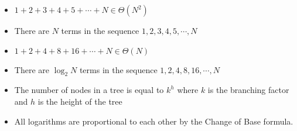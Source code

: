 \begin{itemize}
\item $1 + 2 + 3 + 4 + 5 + \cdots + N \in \Theta(N^2)$
\item There are $N$ terms in the sequence $1, 2, 3, 4, 5, \cdots, N$
\item $1 + 2 + 4 + 8 + 16 + \cdots + N \in \Theta(N)$
\item There are $\log_{2} N$ terms in the sequence $1, 2, 4, 8, 16, \cdots, N$
\item The number of nodes in a tree is equal to $k^{h}$ where $k$ is the
branching factor and $h$ is the height of the tree
\item All logarithms are proportional to each other by the Change of Base
formula.
\end{itemize}
